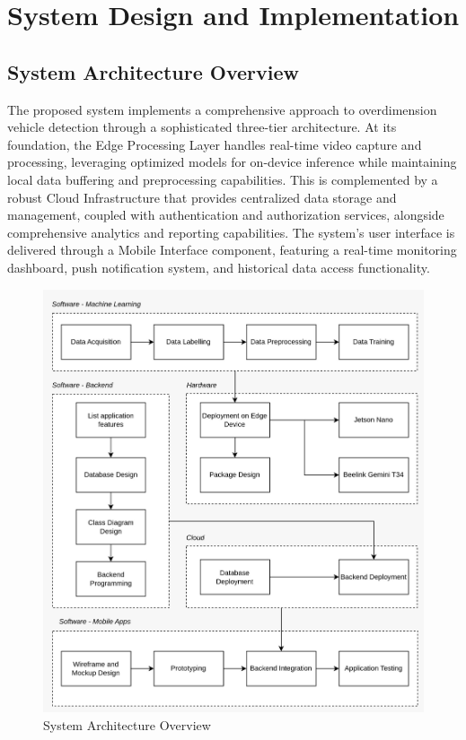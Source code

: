 \section{System Design and Implementation}
\label{sec:designandimplementation}

\subsection{System Architecture Overview}

The proposed system implements a comprehensive approach to overdimension vehicle detection through a sophisticated three-tier architecture. At its foundation, the Edge Processing Layer handles real-time video capture and processing, leveraging optimized models for on-device inference while maintaining local data buffering and preprocessing capabilities. This is complemented by a robust Cloud Infrastructure that provides centralized data storage and management, coupled with authentication and authorization services, alongside comprehensive analytics and reporting capabilities. The system's user interface is delivered through a Mobile Interface component, featuring a real-time monitoring dashboard, push notification system, and historical data access functionality.

\begin{figure}[htbp]
  \centering
  \includegraphics[scale=0.15]{gambar/bab3-block-diagram-en.jpeg}
  \caption{System Architecture Overview}
  \label{fig:arsitektur_sistem}
\end{figure}

